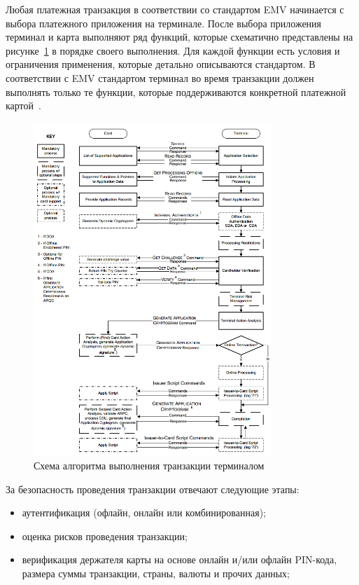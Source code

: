 Любая платежная транзакция в соответствии со стандартом EMV начинается с выбора платежного приложения на терминале.
После выбора приложения терминал и карта выполняют ряд функций, которые схематично представлены на рисунке~\ref{fig:transaction_flow_example} в порядке своего выполнения.
Для каждой функции есть условия и ограничения применения, которые детально описываются стандартом.
В соответствии с EMV стандартом терминал во время транзакции должен выполнять только те функции, которые поддерживаются конкретной платежной картой~\cite{emv_book_3}.


\begin{figure}[H]
    \centering
    \includegraphics[width=0.8\textwidth]{images/research/transaction_flow_example}
    \caption{\centering Схема алгоритма выполнения транзакции терминалом}
    \label{fig:transaction_flow_example}
\end{figure}

За безопасность проведения транзакции отвечают следующие этапы:

\begin{itemize}
    \item аутентификация (офлайн, онлайн или комбинированная);
    \item оценка рисков проведения транзакции;
    \item верификация держателя карты на основе онлайн и/или офлайн PIN-кода, размера суммы транзакции, страны, валюты и прочих данных;
\end{itemize}

